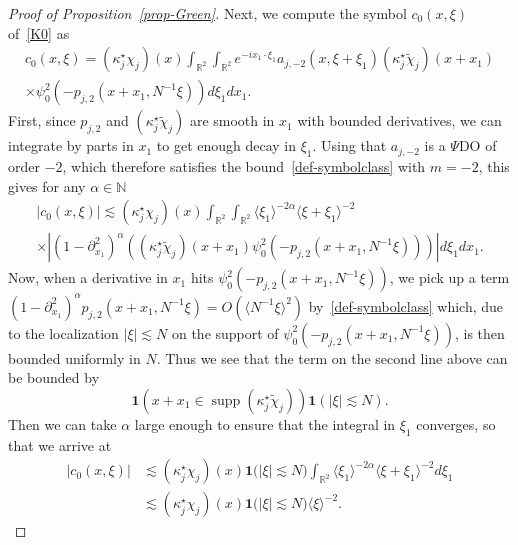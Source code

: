 \documentclass[AHL,Unicode,longabstracts,published]{cedram}
\newcommand{\R}{\mathbb{R}}
\newcommand{\N}{\mathbb{N}}
\DeclareMathOperator*{\supp}{supp}
\newcommand{\ind}{\mathbf{1}}
\newcommand{\al}{\alpha}
\newcommand{\kk}{\kappa}
\newcommand{\wt}{\widetilde}
\newcommand{\les}{\lesssim}
\newcommand{\jb}[1] {\langle #1 \rangle}
\begin{document}
\begin{proof}[Proof of Proposition~\ref{prop-Green}]
Next, we compute the symbol $c_0(x,\xi)$ of~\eqref{K0} as
\begin{multline}\label{def-c0}
c_0(x,\xi)=\left(\kk_j^\star\chi_j\right)(x)\int_{\R^2}\int_{\R^2}e^{-ix_1\cdot\xi_1}a_{j,-2}(x,\xi+\xi_1)\left(\kk_j^\star\wt\chi_j\right)(x+x_1)\\
\times\psi_0^2\left(-p_{j,2}\left(x+x_1,N^{-1}\xi\right)\right)d\xi_1dx_1.
\end{multline}
First, since $p_{j,2}$ and $(\kk_j^\star\wt\chi_j)$ are smooth in $x_1$ with bounded derivatives, we can integrate by parts in $x_1$ to get enough decay in $\xi_1$. Using that $a_{j,-2}$ is a $\Psi$DO of order $-2$, which therefore satisfies the bound~\eqref{def-symbolclass} with $m=-2$, this gives for any $\al \in \N$
\begin{multline*}
|c_0(x,\xi)|\les\left(\kk_j^\star\chi_j\right)(x)\int_{\R^2}\int_{\R^2}\jb{\xi_1}^{-2\al}\jb{\xi+\xi_1}^{-2}\\
\times\left|\left(1-\partial_{x_1}^2\right)^{\al}\left(\left(\kk_j^\star\wt\chi_j\right)(x+x_1)\psi_0^2\left(-p_{j,2}\left(x+x_1,N^{-1}\xi\right)\right)\right)\right|d\xi_1dx_1.
\end{multline*}
Now, when a derivative in $x_1$ hits $\psi_0^2(-p_{j,2}(x+x_1,N^{-1}\xi))$, we pick up a term $(1-\partial_{x_1}^2)^\al p_{j,2}(x+x_1,N^{-1}\xi)=O(\jb{N^{-1}\xi}^2)$ by~\eqref{def-symbolclass} which, due to the localization $|\xi|\les N$ on the support of $\psi_0^2(-p_{j,2}(x+x_1,N^{-1}\xi))$, is then bounded uniformly in $N$. Thus we see that the term on the second line above can be bounded by
\begin{equation*}
\ind\left(x+x_1\in\supp\left(\kk_j^\star\wt
\chi_j\right)\right)\ind(|\xi|\les N).
\end{equation*}
Then we can take $\al$ large enough to ensure that the integral in $\xi_1$ converges, so that we arrive at
\begin{equation}\label{c0}
\begin{split}
|c_0(x,\xi)| &\les \left(\kk_j^\star\chi_j\right)(x)\ind\big(|\xi|\les N\big)\int_{\R^2}\jb{\xi_1}^{-2\alpha}\jb{\xi+\xi_1}^{-2}d\xi_1
\\
&\les \left(\kk_j^\star\chi_j\right)(x)\ind\big(|\xi|\les N\big)\jb{\xi}^{-2}.
\end{split}
\end{equation}


\end{proof}
\end{document}
